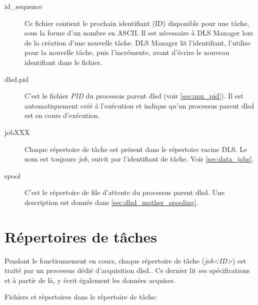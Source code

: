 \documentclass[a4paper,12pt,BCOR6mm,bibtotoc,idxtotoc]{scrbook}
\begin{document}
\begin{description}

\item[id\_sequence] Ce fichier contient le prochain identifiant (ID)
  disponible pour une t\^ache, sous la forme d'un nombre en ASCII. Il
  est n\'ecessaire \`a DLS Manager lors de la cr\'eation d'une
  nouvelle t\^ache. DLS Manager lit l'identifiant, l'utilise pour la
  nouvelle t\^ache, puis l'incr\'emente, avant d'\'ecrire le nouveau
  identifiant dans le fichier.

\item[dlsd.pid] C'est le fichier \textit{PID} du
  processus parent dlsd (voir \autoref{sec:apx_pid}). Il est automatiquement
  cr\'e\'e \`a l'ex\'ecution et indique qu'un processus parent dlsd est en cours
  d'ex\'ecution.

\item[jobXXX] Chaque r\'epertoire de t\^ache est pr\'esent dans le
  r\'epertoire racine DLS.  Le nom est toujours \textit{job}, suivit
  par l'identifiant de t\^ache. Voir \autoref{sec:data_jobs}.

\item[spool]
  C'est le r\'epertoire de file d'attente du processus parent dlsd.
  Une description est donn\'ee dans \autoref{sec:dlsd_mother_spooling}.

\end{description}



\section{R\'epertoires de t\^aches}
\label{sec:data_jobs}

Pendant le fonctionnement en cours, chaque r\'epertoire de t\^ache
(\textit{job\textless ID\textgreater}) est trait\'e par un processus
d\'edi\'e d'acquisition dlsd.. Ce dernier lit ses sp\'ecifications et
\`a partir de l\`a, y \'ecrit \'egalement les donn\'ees acquises.

Fichiers et r\'epertoires dans le r\'epertoire de t\^ache:
\end{document}
